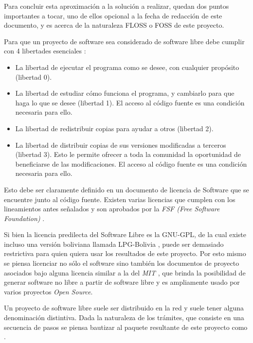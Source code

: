 Para concluir esta aproximación a la solución a realizar, quedan dos puntos
importantes a tocar, uno de ellos opcional a la fecha de redacción de este
documento, y es acerca de la naturaleza FLOSS o FOSS de este proyecto.

Para que un proyecto de software sea considerado de software libre debe cumplir
con 4 libertades esenciales \cite{QueEsSoftware}:

\begin{itemize}
	\item La libertad de ejecutar el programa como se desee, con cualquier
	      propósito (libertad 0).

	\item La libertad de estudiar cómo funciona el programa, y cambiarlo para
	      que haga lo que se desee (libertad 1). El acceso al código fuente es una
	      condición necesaria para ello.

	\item La libertad de redistribuir copias para ayudar a otros (libertad 2).

	\item La libertad de distribuir copias de sus versiones modificadas a
	      terceros (libertad 3). Esto le permite ofrecer a toda la comunidad la
	      oportunidad de beneficiarse de las modificaciones. El acceso al código
	      fuente es una condición necesaria para ello.
\end{itemize}

Esto debe ser claramente definido en un documento de licencia de Software que se
encuentre junto al código fuente. Existen varias licencias que cumplen con los
lineamientos antes señalados y son aprobados por la \textit{FSF (Free Software
Foundation)} \cite{VariousLicensesComments}.

Si bien la licencia predilecta del Software Libre es la GNU-GPL, de la cual
existe incluso una versión boliviana llamada LPG-Bolivia
\cite{cayoLPGBoliviaADSIB}, puede ser demasiado restrictiva para quien quiera
usar los resultados de este proyecto. Por esto mismo se piensa licenciar no sólo
el software sino también los documentos de proyecto asociados bajo alguna
licencia similar a la del \textit{MIT \cite{MITLicense2006}}, que brinda la posibilidad
de generar software no libre a partir de software libre y es ampliamente usado
por varios proyectos \textit{Open Source}.

Un proyecto de software libre suele ser distribuido en la red y suele tener
alguna denominación distintiva. Dada la naturaleza de los trámites, que consiste
en una secuencia de pasos se piensa bautizar al paquete resultante de este
proyecto como .